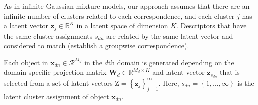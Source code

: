 \documentclass[]{article}
\newcommand{\Z}{\boldsymbol{\mathrm{Z}}}
\newcommand{\indobj}{\mathbf{x}_{dn}}
\newcommand{\projMat}{\boldsymbol{\mathcal{W}}_d}
\newcommand{\projMatI}{\mathbf{W}_d}
\newcommand{\lvecI}{\mathbf{z}_j}
\newcommand{\lvecsI}{\mathbf{z}_{s_{dn}}}
\newcommand{\lvec}{\boldsymbol{\zeta}_j}
\newcommand{\mixwe}{{\theta}_j}
\newcommand{\phixnd}{\boldsymbol{\phi}\left(\indobj\right)}
\begin{document}
%

As in infinite Gaussian mixture models, our approach assumes that there are an infinite number of clusters related to each
correspondence, and each cluster $j$ has a latent vector $\lvecI\in \mathbb{R}^K$ in a latent space of dimension $K$. Descriptors that have the same cluster assignments $s_{dn}$ are related by the same latent vector and considered to match (establish a groupwise correspondence).

Each object in $\indobj \in \mathcal{R}^{M_d}$ in the $d$th domain is generated depending on the domain-specific projection matrix $\projMatI \in \mathbb{R}^{M_d \times K}$ and latent vector $\lvecsI$ that is selected from a set of latent vectors $\Z = \left\{\lvecI\right\}_{j=1}^\infty$. Here, $s_{dn}=\left\{1,\dots,\infty\right\}$ is the latent cluster assignment of object $\indobj$.
\end{document}
